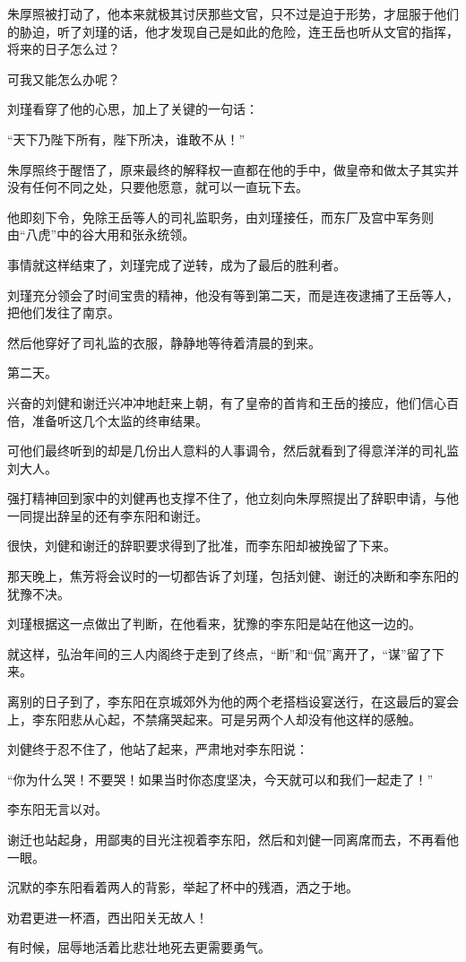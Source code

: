 \begin{multicols}{\theparacolNo}
		朱厚照被打动了，他本来就极其讨厌那些文官，只不过是迫于形势，才屈服于他们的胁迫，听了刘瑾的话，他才发现自己是如此的危险，连王岳也听从文官的指挥，将来的日子怎么过？

		可我又能怎么办呢？

		刘瑾看穿了他的心思，加上了关键的一句话：

		“天下乃陛下所有，陛下所决，谁敢不从！”

		朱厚照终于醒悟了，原来最终的解释权一直都在他的手中，做皇帝和做太子其实并没有任何不同之处，只要他愿意，就可以一直玩下去。

		他即刻下令，免除王岳等人的司礼监职务，由刘瑾接任，而东厂及宫中军务则由“八虎”中的谷大用和张永统领。

		事情就这样结束了，刘瑾完成了逆转，成为了最后的胜利者。

		刘瑾充分领会了时间宝贵的精神，他没有等到第二天，而是连夜逮捕了王岳等人，把他们发往了南京。

		然后他穿好了司礼监的衣服，静静地等待着清晨的到来。

		第二天。

		兴奋的刘健和谢迁兴冲冲地赶来上朝，有了皇帝的首肯和王岳的接应，他们信心百倍，准备听这几个太监的终审结果。

		可他们最终听到的却是几份出人意料的人事调令，然后就看到了得意洋洋的司礼监刘大人。

		强打精神回到家中的刘健再也支撑不住了，他立刻向朱厚照提出了辞职申请，与他一同提出辞呈的还有李东阳和谢迁。

		很快，刘健和谢迁的辞职要求得到了批准，而李东阳却被挽留了下来。

		那天晚上，焦芳将会议时的一切都告诉了刘瑾，包括刘健、谢迁的决断和李东阳的犹豫不决。

		刘瑾根据这一点做出了判断，在他看来，犹豫的李东阳是站在他这一边的。

		就这样，弘治年间的三人内阁终于走到了终点，“断”和“侃”离开了，“谋”留了下来。

		离别的日子到了，李东阳在京城郊外为他的两个老搭档设宴送行，在这最后的宴会上，李东阳悲从心起，不禁痛哭起来。可是另两个人却没有他这样的感触。

		刘健终于忍不住了，他站了起来，严肃地对李东阳说：

		“你为什么哭！不要哭！如果当时你态度坚决，今天就可以和我们一起走了！”

		李东阳无言以对。

		谢迁也站起身，用鄙夷的目光注视着李东阳，然后和刘健一同离席而去，不再看他一眼。

		沉默的李东阳看着两人的背影，举起了杯中的残酒，洒之于地。

		劝君更进一杯酒，西出阳关无故人！

		有时候，屈辱地活着比悲壮地死去更需要勇气。
		\ifnum{}
	\end{multicols}
\fi
\newpage
